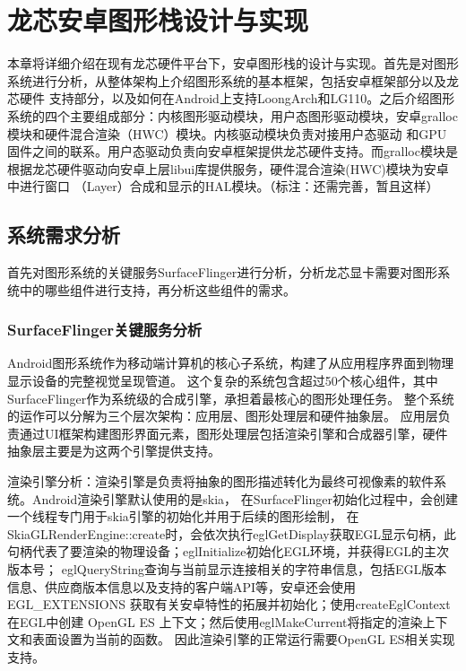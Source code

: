 
\chapter{龙芯安卓图形栈设计与实现}
本章将详细介绍在现有龙芯硬件平台下，安卓图形栈的设计与实现。首先是对图形系统进行分析，从整体架构上介绍图形系统的基本框架，包括安卓框架部分以及龙芯硬件
支持部分，以及如何在Android上支持LoongArch和LG110。之后介绍图形系统的四个主要组成部分：内核图形驱动模块，用户态图形驱动模块，安卓gralloc模块和硬件混合渲染（HWC）模块。内核驱动模块负责对接用户态驱动
和GPU固件之间的联系。用户态驱动负责向安卓框架提供龙芯硬件支持。而gralloc模块是根据龙芯硬件驱动向安卓上层libui库提供服务，硬件混合渲染(HWC)模块为安卓中进行窗口
（Layer）合成和显示的HAL模块。（标注：还需完善，暂且这样）

\section{系统需求分析}

首先对图形系统的关键服务SurfaceFlinger进行分析，分析龙芯显卡需要对图形系统中的哪些组件进行支持，再分析这些组件的需求。

\subsection{SurfaceFlinger关键服务分析}
Android图形系统作为移动端计算机的核心子系统，构建了从应用程序界面到物理显示设备的完整视觉呈现管道。
这个复杂的系统包含超过50个核心组件，其中SurfaceFlinger作为系统级的合成引擎，承担着最核心的图形处理任务。
整个系统的运作可以分解为三个层次架构：应用层、图形处理层和硬件抽象层。
应用层负责通过UI框架构建图形界面元素，图形处理层包括渲染引擎和合成器引擎，硬件抽象层主要是为这两个引擎提供支持。

渲染引擎分析：渲染引擎​是负责将抽象的图形描述转化为最终可视像素的软件系统。Android渲染引擎默认使用的是skia，
在SurfaceFlinger初始化过程中，会创建一个线程专门用于skia引擎的初始化并用于后续的图形绘制，
在SkiaGLRenderEngine::create时，会依次执行eglGetDisplay获取EGL显示句柄，此句柄代表了要渲染的物理设备；eglInitialize初始化EGL环境，并获得EGL的主次版本号；
eglQueryString查询与当前显示连接相关的字符串信息，包括EGL版本信息、供应商版本信息以及支持的客户端API等，安卓还会使用EGL\_EXTENSIONS
获取有关安卓特性的拓展并初始化；使用createEglContext在EGL中创建 OpenGL ES 上下文；然后使用eglMakeCurrent将指定的渲染上下文和表面设置为当前的函数。
因此渲染引擎的正常运行需要OpenGL ES相关实现支持。

